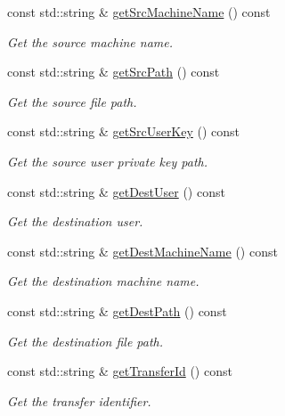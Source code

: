 \begin{DoxyCompactItemize}
const std::string \& \hyperlink{classTransferExec_a8d0cca50b2d2900583d7343b5f3cb9b0}{getSrcMachineName} () const 
\begin{DoxyCompactList}\small\item\em Get the source machine name. \item\end{DoxyCompactList}\item 
const std::string \& \hyperlink{classTransferExec_a7425cefb19935efa54276203ce40bfd0}{getSrcPath} () const 
\begin{DoxyCompactList}\small\item\em Get the source file path. \item\end{DoxyCompactList}\item 
const std::string \& \hyperlink{classTransferExec_a9281e3a4b3a8cb09470bcddb5fb9c3be}{getSrcUserKey} () const 
\begin{DoxyCompactList}\small\item\em Get the source user private key path. \item\end{DoxyCompactList}\item 
const std::string \& \hyperlink{classTransferExec_afe64c0f5f647578942db241ad830584f}{getDestUser} () const 
\begin{DoxyCompactList}\small\item\em Get the destination user. \item\end{DoxyCompactList}\item 
const std::string \& \hyperlink{classTransferExec_aae14f691285e71b2e949484accc9c5a2}{getDestMachineName} () const 
\begin{DoxyCompactList}\small\item\em Get the destination machine name. \item\end{DoxyCompactList}\item 
const std::string \& \hyperlink{classTransferExec_a272346c2e9436ee54fed818b6db6698a}{getDestPath} () const 
\begin{DoxyCompactList}\small\item\em Get the destination file path. \item\end{DoxyCompactList}\item 
const std::string \& \hyperlink{classTransferExec_a9f3567ec4e70971624e3e2b4281bdd5c}{getTransferId} () const 
\begin{DoxyCompactList}\small\item\em Get the transfer identifier. \item\end{DoxyCompactList}\item 

\end{DoxyCompactItemize}
